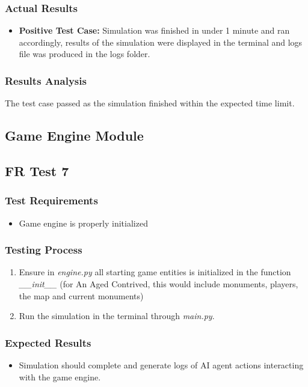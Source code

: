 \documentclass[12pt, titlepage]{article}
\begin{document}
\subsubsection{Actual Results}
\begin{itemize}
    \item \textbf{Positive Test Case:} Simulation was finished in under 1 minute and ran accordingly, results of the simulation were displayed in the terminal and logs file was produced in the logs folder.
\end{itemize}
\subsubsection{Results Analysis}
The test case passed as the simulation finished within the expected time limit.
\subsection{Game Engine Module}

\subsection{FR Test 7}
\subsubsection{Test Requirements}
\begin{itemize}
    \item Game engine is properly initialized
\end{itemize}
\subsubsection{Testing Process}
\begin{enumerate}
    \item Ensure in \textit{engine.py} all starting game entities is initialized in the function \textit{\_\_init\_\_} (for An Aged Contrived, this would include monuments, players, the map and current monuments)
    \item Run the simulation in the terminal through \textit{main.py}.
\end{enumerate}
\subsubsection{Expected Results}
\begin{itemize}
    \item Simulation should complete and generate logs of AI agent actions interacting with the game engine.
\end{itemize}
\end{document}
